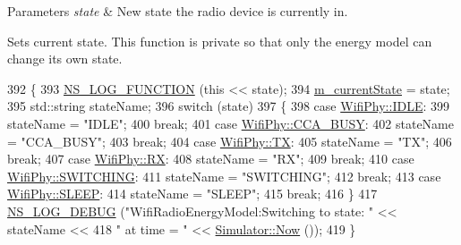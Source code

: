 \begin{DoxyParams}{Parameters}
{\em state} & New state the radio device is currently in.\\
\hline
\end{DoxyParams}
Sets current state. This function is private so that only the energy model can change its own state. 
\begin{DoxyCode}
392 \{
393   \hyperlink{log-macros-disabled_8h_a90b90d5bad1f39cb1b64923ea94c0761}{NS\_LOG\_FUNCTION} (\textcolor{keyword}{this} << state);
394   \hyperlink{classns3_1_1WifiRadioEnergyModel_a3f7bc986f460d8d987a7104c71c952a4}{m\_currentState} = state;
395   std::string stateName;
396   \textcolor{keywordflow}{switch} (state)
397     \{
398     \textcolor{keywordflow}{case} \hyperlink{classns3_1_1WifiPhy_af97408fa76f99797497b492758467143ab82b721cfd612ae187d78ffc812c567d}{WifiPhy::IDLE}:
399       stateName = \textcolor{stringliteral}{"IDLE"};
400       \textcolor{keywordflow}{break};
401     \textcolor{keywordflow}{case} \hyperlink{classns3_1_1WifiPhy_af97408fa76f99797497b492758467143aaec7a6711c1e391040d923fc0efcc849}{WifiPhy::CCA\_BUSY}:
402       stateName = \textcolor{stringliteral}{"CCA\_BUSY"};
403       \textcolor{keywordflow}{break};
404     \textcolor{keywordflow}{case} \hyperlink{classns3_1_1WifiPhy_af97408fa76f99797497b492758467143a69db14ff4bed82ca0242f8b09065ff09}{WifiPhy::TX}:
405       stateName = \textcolor{stringliteral}{"TX"};
406       \textcolor{keywordflow}{break};
407     \textcolor{keywordflow}{case} \hyperlink{classns3_1_1WifiPhy_af97408fa76f99797497b492758467143a7c7899649be8e296e8907e47aacf148e}{WifiPhy::RX}:
408       stateName = \textcolor{stringliteral}{"RX"};
409       \textcolor{keywordflow}{break};
410     \textcolor{keywordflow}{case} \hyperlink{classns3_1_1WifiPhy_af97408fa76f99797497b492758467143a2d51e3db3a961114a197a35838adeee5}{WifiPhy::SWITCHING}:
411       stateName = \textcolor{stringliteral}{"SWITCHING"};
412       \textcolor{keywordflow}{break};
413     \textcolor{keywordflow}{case} \hyperlink{classns3_1_1WifiPhy_af97408fa76f99797497b492758467143ad77ab37fb7a2710222a92a3b81d23b65}{WifiPhy::SLEEP}:
414       stateName = \textcolor{stringliteral}{"SLEEP"};
415       \textcolor{keywordflow}{break};
416     \}
417   \hyperlink{group__logging_ga413f1886406d49f59a6a0a89b77b4d0a}{NS\_LOG\_DEBUG} (\textcolor{stringliteral}{"WifiRadioEnergyModel:Switching to state: "} << stateName <<
418                 \textcolor{stringliteral}{" at time = "} << \hyperlink{classns3_1_1Simulator_ac3178fa975b419f7875e7105be122800}{Simulator::Now} ());
419 \}
\end{DoxyCode}


